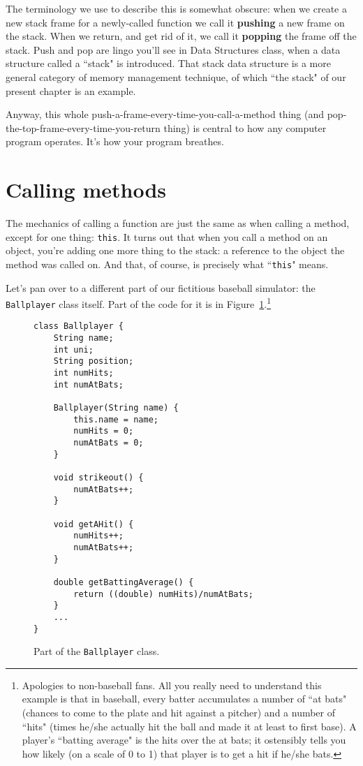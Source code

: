 The terminology we use to describe this is somewhat obscure: when we create a
new stack frame for a newly-called function we call it \textbf{pushing} a new
frame on the stack. When we return, and get rid of it, we call it
\textbf{popping} the frame off the stack. Push and pop are lingo you'll see in
Data Structures class, when a data structure called a ``stack" is introduced.
That stack data structure is a more general category of memory management
technique, of which ``the stack" of our present chapter is an example.

Anyway, this whole push-a-frame-every-time-you-call-a-method thing (and
pop-the-top-frame-every-time-you-return thing) is central to how any computer
program operates. It's how your program breathes.


\section{Calling methods}

The mechanics of calling a function are just the same as when calling a
method, except for one thing: \texttt{this}. It turns out that when you call a
method on an object, you're adding one more thing to the stack: a reference to
the object the method was called on. And that, of course, is precisely what
``\texttt{this}" means.

Let's pan over to a different part of our fictitious baseball simulator: the
\texttt{Ballplayer} class itself. Part of the code for it is in
Figure~\ref{fig:BallplayerCode}.\footnote{Apologies to non-baseball fans. All
you really need to understand this example is that in baseball, every batter
accumulates a number of ``at bats" (chances to come to the plate and hit
against a pitcher) and a number of ``hits" (times he/she actually hit the ball
and made it at least to first base). A player's ``batting average" is the hits
over the at bats; it ostensibly tells you how likely (on a scale of 0 to 1)
that player is to get a hit if he/she bats.}

\begin{figure}[ht]
\begin{Verbatim}[fontsize=\footnotesize,samepage=true,frame=single]
class Ballplayer {
    String name;
    int uni;
    String position;
    int numHits;
    int numAtBats;

    Ballplayer(String name) {
        this.name = name;
        numHits = 0;
        numAtBats = 0;
    }

    void strikeout() {
        numAtBats++;
    }

    void getAHit() {
        numHits++;
        numAtBats++;
    }

    double getBattingAverage() {
        return ((double) numHits)/numAtBats;
    }
    ...
}
\end{Verbatim}
\caption{Part of the \texttt{Ballplayer} class.}
\label{fig:BallplayerCode}
\end{figure}


